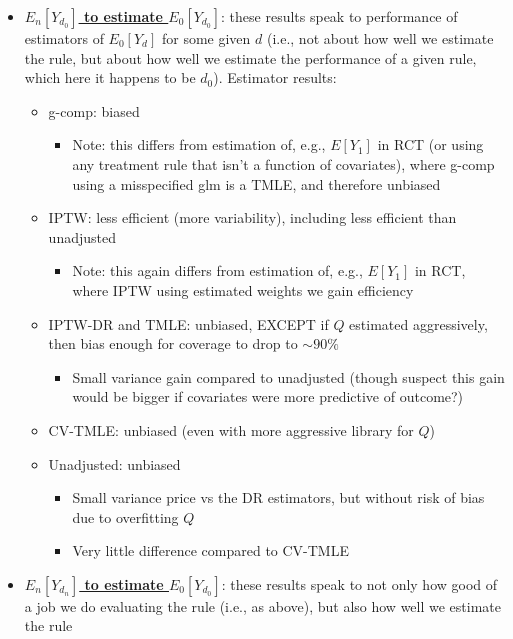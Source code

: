 \documentclass[11pt]{article}\usepackage[]{graphicx}\usepackage[]{color}
\begin{document}
\begin{itemize}
    \item \underline{\textbf{$E_n[Y_{d_0}]$ to estimate $E_0[Y_{d_0}]$}}: these results speak to performance of estimators of $E_0[Y_{d}]$ for some given $d$ (i.e., not about how well we estimate the rule, but about how well we estimate the performance of a given rule, which here it happens to be $d_0$). Estimator results:
    \begin{itemize}
        \item g-comp: biased
        \begin{itemize}
            \item Note: this differs from estimation of, e.g., $E[Y_1]$ in RCT (or using any treatment rule that isn't a function of covariates), where g-comp using a misspecified glm is a TMLE, and therefore unbiased
        \end{itemize}
        \item IPTW: less efficient (more variability), including less efficient than unadjusted
        \begin{itemize}
            \item Note: this again differs from estimation of, e.g., $E[Y_1]$ in RCT, where IPTW using estimated weights we gain efficiency
        \end{itemize}
        \item IPTW-DR and TMLE: unbiased, EXCEPT if $Q$ estimated aggressively, then bias enough for coverage to drop to $\sim 90\%$
        \begin{itemize}
            \item Small variance gain compared to unadjusted (though suspect this gain would be bigger if covariates were more predictive of outcome?)
        \end{itemize}
\item CV-TMLE: unbiased (even with more aggressive library for $Q$)
\item Unadjusted: unbiased
\begin{itemize}
    \item Small variance price vs the DR estimators, but without risk of bias due to overfitting $Q$
    \item Very little difference compared to CV-TMLE
\end{itemize}
    \end{itemize}
    \item \underline{\textbf{$E_n[Y_{d_n}]$ to estimate $E_0[Y_{d_0}]$}}: these results speak to not only how good of a job we do evaluating the rule (i.e., as above), but also how well we estimate the rule

\end{itemize}
\end{document}

